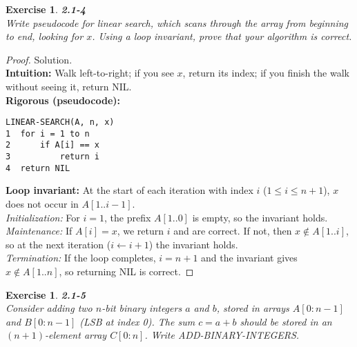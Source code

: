 \documentclass[12pt]{article}
\newtheorem{exercise}[theorem]{Exercise}
\theoremstyle{definition}
\begin{document}
\newpage

\begin{exercise}
\noindent
\textbf{2.1-4}\\
\noindent
Write pseudocode for linear search, which scans through the array from beginning
to end, looking for $x$. Using a loop invariant, prove that your algorithm is correct.
\end{exercise}

\vspace{1pt}

\begin{proof}
Solution.\\

\noindent
\textbf{Intuition:} Walk left-to-right; if you see $x$, return its index; if you finish
the walk without seeing it, return \textsc{NIL}.\\

\noindent
\textbf{Rigorous (pseudocode):}
\begin{verbatim}
LINEAR-SEARCH(A, n, x)
1  for i = 1 to n
2      if A[i] == x
3          return i
4  return NIL
\end{verbatim}
\textbf{Loop invariant:} At the start of each iteration with index $i$ ($1\le i\le n+1$),
$x$ does not occur in $A[1..i-1]$.\\
\emph{Initialization:} For $i=1$, the prefix $A[1..0]$ is empty, so the invariant holds.\\
\emph{Maintenance:} If $A[i]=x$, we return $i$ and are correct. If not, then
$x\notin A[1..i]$, so at the next iteration ($i\!\gets\! i+1$) the invariant holds.\\
\emph{Termination:} If the loop completes, $i=n+1$ and the invariant gives
$x\notin A[1..n]$, so returning \textsc{NIL} is correct.
\end{proof}

\newpage

\begin{exercise}
\noindent
\textbf{2.1-5}\\
\noindent
Consider adding two $n$-bit binary integers $a$ and $b$, stored in arrays
$A[0:n-1]$ and $B[0:n-1]$ (LSB at index 0). The sum $c=a+b$ should be stored
in an $(n+1)$-element array $C[0:n]$. Write \textsc{ADD-BINARY-INTEGERS}.
\end{exercise}

\vspace{1pt}
\end{document}
